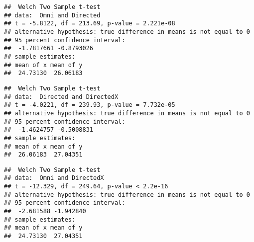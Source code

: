 \begin{verbatim}
##  Welch Two Sample t-test
## data:  Omni and Directed
## t = -5.8122, df = 213.69, p-value = 2.221e-08
## alternative hypothesis: true difference in means is not equal to 0
## 95 percent confidence interval:
##  -1.7817661 -0.8793026
## sample estimates:
## mean of x mean of y 
##  24.73130  26.06183
\end{verbatim}

\begin{Shaded}
\begin{Highlighting}[]
 \NormalTok{)}
\end{Highlighting}
\end{Shaded}

\begin{verbatim}
##  Welch Two Sample t-test
## data:  Directed and DirectedX
## t = -4.0221, df = 239.93, p-value = 7.732e-05
## alternative hypothesis: true difference in means is not equal to 0
## 95 percent confidence interval:
##  -1.4624757 -0.5008831
## sample estimates:
## mean of x mean of y 
##  26.06183  27.04351
\end{verbatim}

\begin{Shaded}
\begin{Highlighting}[]
 \NormalTok{)}
\end{Highlighting}
\end{Shaded}

\begin{verbatim}
##  Welch Two Sample t-test
## data:  Omni and DirectedX
## t = -12.329, df = 249.64, p-value < 2.2e-16
## alternative hypothesis: true difference in means is not equal to 0
## 95 percent confidence interval:
##  -2.681588 -1.942840
## sample estimates:
## mean of x mean of y 
##  24.73130  27.04351
\end{verbatim}

\pagebreak

\begin{Shaded}
\begin{Highlighting}[]
 \NormalTok{)}
\end{Highlighting}
\end{Shaded}
% 

